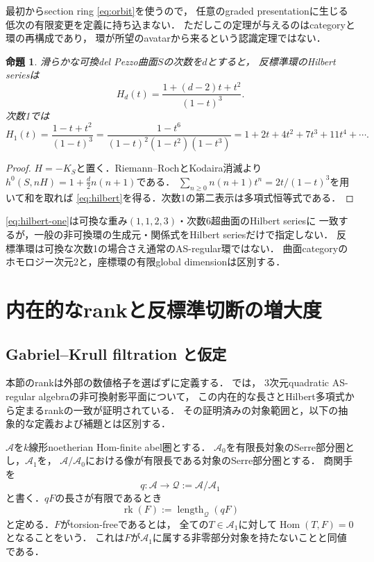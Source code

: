 \documentclass[11pt,a4paper]{ltjsarticle}
\newtheorem{proposition}[theorem]{命題}
\theoremstyle{definition}
\renewcommand{\AA}{\mathcal A}
\newcommand{\Hom}{\operatorname{Hom}}
\newcommand{\rk}{\operatorname{rk}}
\begin{document}
最初からsection ring \eqref{eq:orbit}を使うので，
任意のgraded presentationに生じる低次の有限変更を定義に持ち込まない．
ただしこの定理が与えるのはcategoryと環の再構成であり，
環が所望のavatarから来るという認識定理ではない．

\begin{proposition}\label{prop:hilbert}
滑らかな可換del Pezzo曲面$S$の次数を$d$とすると，
反標準環のHilbert seriesは
\begin{equation}\label{eq:hilbert}
 H_d(t)=\frac{1+(d-2)t+t^2}{(1-t)^3}.
\end{equation}
次数1では
\begin{equation}\label{eq:hilbert-one}
 H_1(t)=\frac{1-t+t^2}{(1-t)^3}
 =\frac{1-t^6}{(1-t)^2(1-t^2)(1-t^3)}
 =1+2t+4t^2+7t^3+11t^4+\cdots.
\end{equation}
\end{proposition}
\begin{proof}
$H=-K_S$と置く．Riemann--RochとKodaira消滅より
$h^0(S,nH)=1+\frac d2 n(n+1)$である．
$\sum_{n\geq0}n(n+1)t^n=2t/(1-t)^3$を用いて和を取れば
\eqref{eq:hilbert}を得る．次数1の第二表示は多項式恒等式である．
\end{proof}

\eqref{eq:hilbert-one}は可換な重み$(1,1,2,3)$・次数6超曲面のHilbert seriesに
一致するが，一般の非可換環の生成元・関係式をHilbert seriesだけで指定しない．
反標準環は可換な次数1の場合さえ通常のAS-regular環ではない．
曲面categoryのホモロジー次元2と，座標環の有限global dimensionは区別する．

\section{内在的なrankと反標準切断の増大度}\label{sec:intrinsic-rank}

\subsection{Gabriel--Krull filtration と仮定}
本節のrankは外部の数値格子を選ばずに定義する．
\cite[Definitions A.3--A.4, Proposition A.6]{AOUCompact}では，
3次元quadratic AS-regular algebraの非可換射影平面について，
この内在的な長さとHilbert多項式から定まるrankの一致が証明されている．
その証明済みの対象範囲と，以下の抽象的な定義および補題とは区別する．

$\AA$を$k$線形noetherian Hom-finite abel圏とする．
$\AA_0$を有限長対象のSerre部分圏とし，$\AA_1$を，
$\AA/\AA_0$における像が有限長である対象のSerre部分圏とする．
商関手を
\[
 q:\AA\longrightarrow\mathcal Q:=\AA/\AA_1
\]
と書く．$qF$の長さが有限であるとき
\[
 \rk(F):=\operatorname{length}_{\mathcal Q}(qF)
\]
と定める．$F$がtorsion-freeであるとは，
全ての$T\in\AA_1$に対して$\Hom(T,F)=0$となることをいう．
これは$F$が$\AA_1$に属する非零部分対象を持たないことと同値である．
\end{document}
